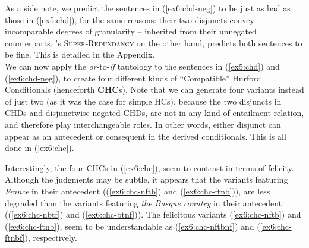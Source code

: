 As a side note, we predict the sentences in (\ref{ex6:chd-neg}) to be just as bad as those in (\ref{ex5:chd}), for the same reasons: their two disjuncts convey incomparable degrees of granularity -- inherited from their unnegated counterparts. \citeauthor{Kalomoiros2024}'s \textsc{Super-Redundancy} on the other hand, predicts both sentences to be fine. This is detailed in the Appendix.\\


We can now apply the \textit{or}-to-\textit{if} tautology to the sentences in (\ref{ex5:chd}) and (\ref{ex6:chd-neg}), to create four different kinds of ``Compatible'' Hurford Conditionals (henceforth \textbf{CHC}s). Note that we can generate four variants instead of just two (as it was the case for simple HCs), because the two disjuncts in CHDs and disjunctwise negated CHDs, are not in any kind of entailment relation, and therefore play interchangeable roles. In other words, either disjunct can appear as an antecedent or consequent in the derived conditionals. This is all done in (\ref{ex6:chc}).

\begin{exe}
	\ex\label{ex6:chc}
	\begin{xlist}
		\label{ex6:chc-nbtf}
		\label{ex6:chc-nftb}
		\label{ex6:chc-btnf}
		\label{ex6:chc-ftnb}
	\end{xlist}
\end{exe} 


Interestingly, the four CHCs in (\ref{ex6:chc}), seem to contrast in terms of felicity. Although the judgments may be subtle, it appears that the variants featuring \textit{France} in their antecedent ((\ref{ex6:chc-nftb}) and (\ref{ex6:chc-ftnb})), are less degraded than the variants featuring \textit{the Basque country} in their antecedent ((\ref{ex6:chc-nbtf}) and (\ref{ex6:chc-btnf})). The felicitous variants (\ref{ex6:chc-nftb}) and (\ref{ex6:chc-ftnb}), seem to be understandable as (\ref{ex6:chc-nftbnf}) and (\ref{ex6:chc-ftnbf}), respectively.


